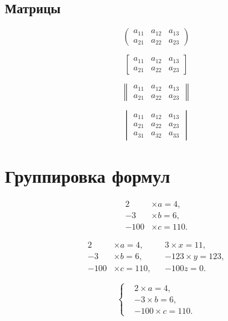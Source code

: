 \documentclass[a4paper,12pt]{article} %
\begin{document}
\subsection{Матрицы}

\[ \begin{pmatrix}
a_{11} & a_{12} & a_{13} \\
a_{21} & a_{22} & a_{23}
\end{pmatrix} \]

\[ \begin{bmatrix}
a_{11} & a_{12} & a_{13} \\
a_{21} & a_{22} & a_{23}
\end{bmatrix} \]

\[ \begin{Vmatrix}
a_{11} & a_{12} & a_{13} \\
a_{21} & a_{22} & a_{23}
\end{Vmatrix} \]

\[ \begin{vmatrix}
a_{11} & a_{12} & a_{13} \\
a_{21} & a_{22} & a_{23} \\
a_{31} & a_{32} & a_{33}
\end{vmatrix} \]

\section{Группировка формул}

\begin{equation}
\begin{aligned}
2 &\times a=4,\\
-3 &\times b = 6,\\
-100 &\times c = 110.
\end{aligned}
\end{equation}

\begin{equation}
\begin{aligned}
2 &\times a=4, & &3 \times x=11,\\
-3 &\times b = 6, & &-123 \times y =123,\\
-100 &\times c = 110, & &-100z=0. 
\end{aligned}
\end{equation}

\[  \left\{
\begin{aligned}
&2 \times a=4,\\
&-3 \times b = 6,\\
&-100 \times c = 110.
\end{aligned} \right.
\]
\end{document}

